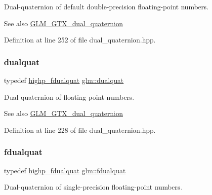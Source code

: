 Dual-\/quaternion of default double-\/precision floating-\/point numbers.

\begin{DoxySeeAlso}{See also}
\mbox{\hyperlink{group__gtx__dual__quaternion}{G\+L\+M\+\_\+\+G\+T\+X\+\_\+dual\+\_\+quaternion}} 
\end{DoxySeeAlso}


Definition at line 252 of file dual\+\_\+quaternion.\+hpp.

\mbox{\label{group__gtx__dual__quaternion_ga2f6227b5f9dc08a2e7682065a84b3aa9}} 
\subsubsection{\texorpdfstring{dualquat}{dualquat}}
{\footnotesize\ttfamily typedef \mbox{\hyperlink{group__gtx__dual__quaternion_ga8c46d61c38b2b6d9c5091c667dd20fe8}{highp\+\_\+fdualquat}} \mbox{\hyperlink{group__gtx__dual__quaternion_ga2f6227b5f9dc08a2e7682065a84b3aa9}{glm\+::dualquat}}}

Dual-\/quaternion of floating-\/point numbers.

\begin{DoxySeeAlso}{See also}
\mbox{\hyperlink{group__gtx__dual__quaternion}{G\+L\+M\+\_\+\+G\+T\+X\+\_\+dual\+\_\+quaternion}} 
\end{DoxySeeAlso}


Definition at line 228 of file dual\+\_\+quaternion.\+hpp.

\mbox{\label{group__gtx__dual__quaternion_ga436906129bc69ca5059555cafcbac9fd}} 
\subsubsection{\texorpdfstring{fdualquat}{fdualquat}}
{\footnotesize\ttfamily typedef \mbox{\hyperlink{group__gtx__dual__quaternion_ga8c46d61c38b2b6d9c5091c667dd20fe8}{highp\+\_\+fdualquat}} \mbox{\hyperlink{group__gtx__dual__quaternion_ga436906129bc69ca5059555cafcbac9fd}{glm\+::fdualquat}}}

Dual-\/quaternion of single-\/precision floating-\/point numbers.

